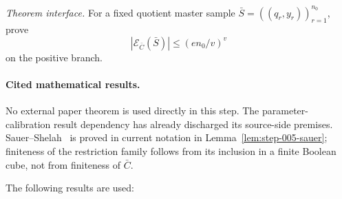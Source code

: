 \noindent\textit{Theorem interface.} For a fixed quotient master sample   \(\bar S=((q_r,y_r))_{r=1}^{n_0}\), prove   \[   |\mathcal E_{\bar C}(\bar S)|\le (e n_0/v)^v   \]   on the positive branch.

\paragraph{Cited mathematical results.}


No external paper theorem is used directly in this step.  The 
parameter-calibration result dependency has already discharged its source-side premises.
Sauer--Shelah~\citep{sauer1972} is proved in current notation in
Lemma~\ref{lem:step-005-sauer}; finiteness of the restriction family follows
from its inclusion in a finite Boolean cube, not from finiteness of
\(\bar C\).

The following results are used:


